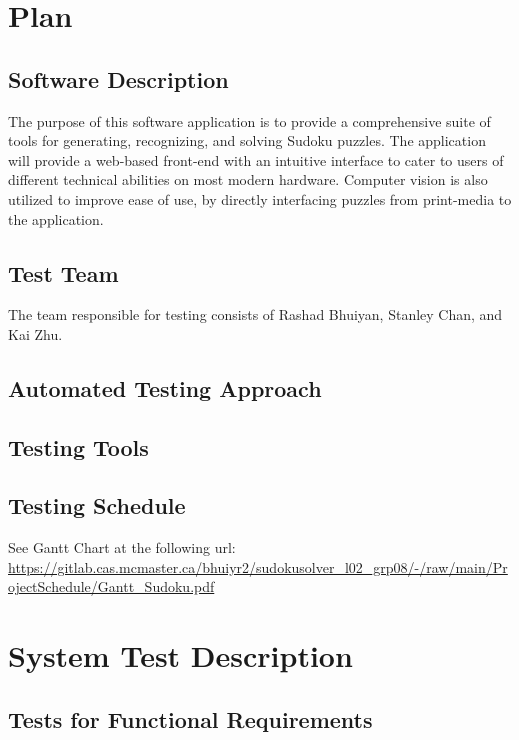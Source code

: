 \documentclass[11pt]{article}
\begin{document}
\newpage

\section{Plan}
	
\subsection{Software Description}
The purpose of this software application is to provide a comprehensive suite of tools for generating, recognizing, and solving Sudoku puzzles. The application will provide a web-based front-end with an intuitive interface to cater to users of different technical abilities on most modern hardware. Computer vision is also utilized to improve ease of use, by directly interfacing puzzles from print-media to the application.

\subsection{Test Team}
The team responsible for testing consists of Rashad Bhuiyan, Stanley Chan, and Kai Zhu.

\subsection{Automated Testing Approach}

\subsection{Testing Tools}

\subsection{Testing Schedule}
		
See Gantt Chart at the following url: \url{https://gitlab.cas.mcmaster.ca/bhuiyr2/sudokusolver_l02_grp08/-/raw/main/ProjectSchedule/Gantt_Sudoku.pdf}

\section{System Test Description}
	
\subsection{Tests for Functional Requirements}
\end{document}
